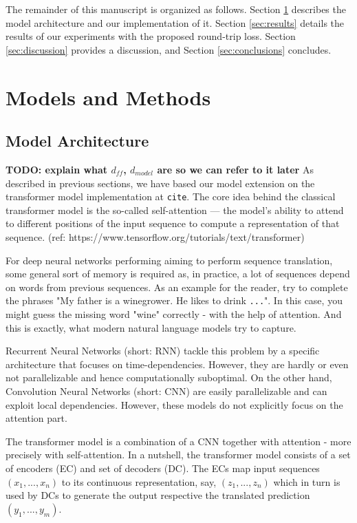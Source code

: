 \documentclass[11pt,a4paper]{article}
\begin{document}
The remainder of this manuscript is organized as follows. Section \ref{sec:models} describes the model architecture and our implementation of it. Section \ref{sec:results} details the results of our experiments with the proposed round-trip loss. Section \ref{sec:discussion} provides a discussion, and Section \ref{sec:conclusions} concludes.
\section{Models and Methods}\label{sec:models}
\subsection{Model Architecture}
{\bf TODO: explain what $d_{ff}$, $d_{model}$ are so we can refer to it later}
As described in previous sections, we have based our model extension on the transformer model implementation at \texttt{cite}. The core idea behind the classical transformer model is the so-called self-attention — the model's ability to attend to different positions of the input sequence to compute a representation of that sequence. (ref: https://www.tensorflow.org/tutorials/text/transformer)

For deep neural networks performing aiming to perform sequence translation, some general sort of memory is required as, in practice, a lot of sequences depend on words from previous sequences. As an example for the reader, try to complete the phrases "My father is a winegrower. He likes to drink {\tt ...}". In this case, you might guess the missing word "wine" correctly - with the help of attention. And this is exactly, what modern natural language models try to capture.

Recurrent Neural Networks (short: RNN) tackle this problem by a specific architecture that focuses on time-dependencies. However, they are hardly or even not parallelizable and hence computationally suboptimal. 
On the other hand, Convolution Neural Networks (short: CNN) are easily parallelizable and can exploit local dependencies. However, these models do not explicitly focus on the attention part. 

The transformer model is a combination of a CNN together with attention - more precisely with self-attention. In a nutshell, the transformer model consists of a set of encoders (EC) and set of decoders (DC). The ECs map input sequences $(x_1,...,x_n)$ to its continuous representation, say, $(z_1,...,z_n)$ which in turn is used by DCs to generate the output respective the translated prediction $(y_1,...,y_m)$.
\end{document}
